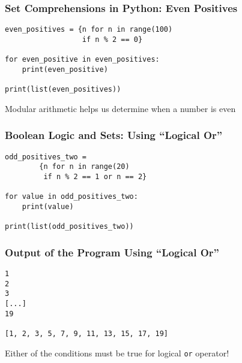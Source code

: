\documentclass[14pt,aspectratio=169]{beamer}
\begin{document}
%
\begin{frame}[fragile]
  \frametitle{Set Comprehensions in Python: Even Positives}
  \normalsize
  \begin{minipage}{6in}
    \vspace*{.25in}
    \begin{verbatim}
even_positives = {n for n in range(100)
                  if n % 2 == 0}

for even_positive in even_positives:
    print(even_positive)

print(list(even_positives))
    \end{verbatim}
  \end{minipage}
  \vspace*{.05in}
  \begin{center}
    \normalsize \noindent Modular arithmetic helps us determine when a number is
    even\\
  \end{center}
\end{frame}

%
\begin{frame}[fragile]
  \frametitle{Boolean Logic and Sets: Using ``Logical Or''}
  \normalsize
  \begin{minipage}{6in}
    \vspace*{.25in}
    \begin{verbatim}
odd_positives_two =
        {n for n in range(20)
         if n % 2 == 1 or n == 2}

for value in odd_positives_two:
    print(value)

print(list(odd_positives_two))
    \end{verbatim}
  \end{minipage}
\end{frame}

%
\begin{frame}[fragile]
  \frametitle{Output of the Program Using ``Logical Or''}
  \normalsize
  \begin{minipage}{6in}
    \vspace*{.15in}
    \begin{verbatim}
1
2
3
[...]
19

[1, 2, 3, 5, 7, 9, 11, 13, 15, 17, 19]
    \end{verbatim}
  \end{minipage}
  \vspace*{.05in}
  \begin{center}
    \normalsize \noindent Either of the conditions must be true for logical
    {\tt or} operator!\\
  \end{center}
\end{frame}
\end{document}
